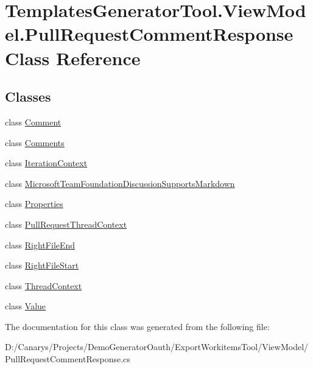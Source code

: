 \hypertarget{class_templates_generator_tool_1_1_view_model_1_1_pull_request_comment_response}{}\section{Templates\+Generator\+Tool.\+View\+Model.\+Pull\+Request\+Comment\+Response Class Reference}
\label{class_templates_generator_tool_1_1_view_model_1_1_pull_request_comment_response}
\subsection*{Classes}
\begin{DoxyCompactItemize}
\item 
class \mbox{\hyperlink{class_templates_generator_tool_1_1_view_model_1_1_pull_request_comment_response_1_1_comment}{Comment}}
\item 
class \mbox{\hyperlink{class_templates_generator_tool_1_1_view_model_1_1_pull_request_comment_response_1_1_comments}{Comments}}
\item 
class \mbox{\hyperlink{class_templates_generator_tool_1_1_view_model_1_1_pull_request_comment_response_1_1_iteration_context}{Iteration\+Context}}
\item 
class \mbox{\hyperlink{class_templates_generator_tool_1_1_view_model_1_1_pull_request_comment_response_1_1_microsoft_te033d878f4bc391c4991265602b9d9ecf}{Microsoft\+Team\+Foundation\+Discussion\+Supports\+Markdown}}
\item 
class \mbox{\hyperlink{class_templates_generator_tool_1_1_view_model_1_1_pull_request_comment_response_1_1_properties}{Properties}}
\item 
class \mbox{\hyperlink{class_templates_generator_tool_1_1_view_model_1_1_pull_request_comment_response_1_1_pull_request_thread_context}{Pull\+Request\+Thread\+Context}}
\item 
class \mbox{\hyperlink{class_templates_generator_tool_1_1_view_model_1_1_pull_request_comment_response_1_1_right_file_end}{Right\+File\+End}}
\item 
class \mbox{\hyperlink{class_templates_generator_tool_1_1_view_model_1_1_pull_request_comment_response_1_1_right_file_start}{Right\+File\+Start}}
\item 
class \mbox{\hyperlink{class_templates_generator_tool_1_1_view_model_1_1_pull_request_comment_response_1_1_thread_context}{Thread\+Context}}
\item 
class \mbox{\hyperlink{class_templates_generator_tool_1_1_view_model_1_1_pull_request_comment_response_1_1_value}{Value}}
\end{DoxyCompactItemize}


The documentation for this class was generated from the following file\+:\begin{DoxyCompactItemize}
\item 
D\+:/\+Canarys/\+Projects/\+Demo\+Generator\+Oauth/\+Export\+Workitems\+Tool/\+View\+Model/Pull\+Request\+Comment\+Response.\+cs\end{DoxyCompactItemize}
